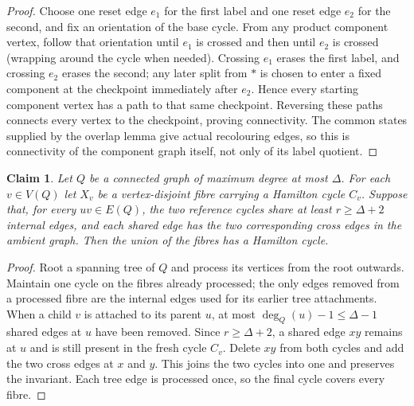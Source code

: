 \documentclass[11pt]{article}
\newtheorem{claim}{Claim}
\theoremstyle{remark}
\numberwithin{equation}{section}
\numberwithin{table}{section}
\begin{document}
\begin{proof}
Choose one reset edge $e_1$ for the first label and one reset edge
$e_2$ for the second, and fix an orientation of the base cycle.  From
any product component vertex, follow that orientation until $e_1$ is
crossed and then until $e_2$ is crossed (wrapping around the cycle when
needed).  Crossing $e_1$ erases the first label, and crossing $e_2$
erases the second; any later split from $\ast$ is chosen to enter a
fixed component at the checkpoint immediately after $e_2$.  Hence every
starting component vertex has a path to that same checkpoint.  Reversing
these paths connects every vertex to the checkpoint, proving
connectivity.  The common states supplied by the overlap lemma give
actual recolouring edges, so this is connectivity of the component
graph itself, not only of its label quotient.
\end{proof}

\begin{claim}\label{lem:protected-tree-splicing}
Let $Q$ be a connected graph of maximum degree at most $\Delta$.  For
each $v\in V(Q)$ let $X_v$ be a vertex-disjoint fibre carrying a
Hamilton cycle $C_v$.  Suppose that, for every $uv\in E(Q)$, the two
reference cycles share at least $r\ge\Delta+2$ internal edges, and
each shared edge has the two corresponding cross edges in the ambient
graph.  Then the union of the fibres has a Hamilton cycle.
\end{claim}
\begin{proof}
Root a spanning tree of $Q$ and process its vertices from the root
outwards.  Maintain one cycle on the fibres already processed; the
only edges removed from a processed fibre are the internal edges used
for its earlier tree attachments.  When a child $v$ is attached to
its parent $u$, at most $\deg_Q(u)-1\le\Delta-1$ shared edges at $u$
have been removed.  Since $r\ge\Delta+2$, a shared edge $xy$ remains
at $u$ and is still present in the fresh cycle $C_v$.  Delete $xy$
from both cycles and add the two cross edges at $x$ and $y$.  This
joins the two cycles into one and preserves the invariant.  Each
tree edge is processed once, so the final cycle covers every fibre.
\end{proof}
\end{document}
